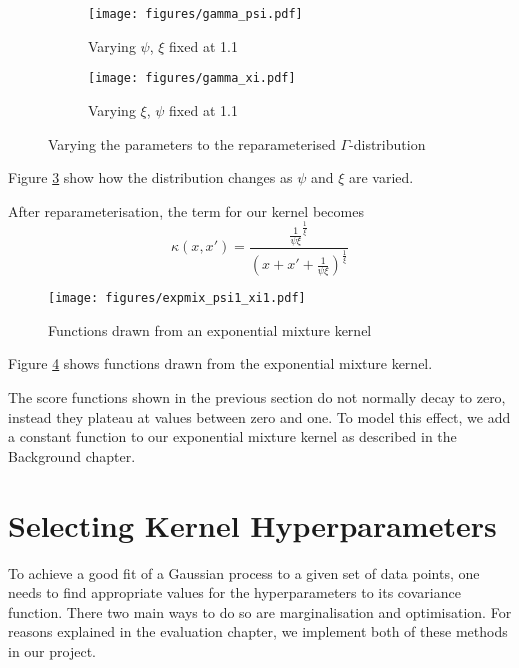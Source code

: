 \documentclass[a4paper,12pt,twoside,openright]{report}
\begin{document}
\begin{figure}
\centering
\begin{subfigure}{.5\textwidth}
  \centering
  \texttt{[image: figures/gamma\_psi.pdf]}
  \caption{Varying $\psi$, $\xi$ fixed at 1.1}
  \label{gammapsi}
\end{subfigure}%
\begin{subfigure}{.5\textwidth}
  \centering
  \texttt{[image: figures/gamma\_xi.pdf]}
  \caption{Varying $\xi$, $\psi$ fixed at 1.1}
  \label{gammaxi}
\end{subfigure}
\caption{Varying the parameters to the reparameterised $\Gamma$-distribution}
\label{gammadist}
\end{figure}


Figure \ref{gammadist} show how the distribution changes as $\psi$ and $\xi$ are varied.

After reparameterisation, the term for our kernel becomes
\begin{equation}
\kappa(x, x') = \frac{\frac{1}{\psi\xi}^{\frac{1}{\xi}}}{(x+x'+\frac{1}{\psi\xi})^{\frac{1}{\xi}}}
\end{equation}

\begin{figure}
\centering

  \centering
  \texttt{[image: figures/expmix\_psi1\_xi1.pdf]}
  \caption{Functions drawn from an exponential mixture kernel}
  \label{expmix11}
\end{figure}

Figure \ref{expmix11} shows functions drawn from the exponential mixture kernel. %

The score functions shown in the previous section do not normally decay to zero, instead they plateau at values between zero and one. To model this effect, we add a constant function to our exponential mixture kernel as described in the Background chapter.

\section{Selecting Kernel Hyperparameters} 


To achieve a good fit of a Gaussian process to a given set of data points, one needs to find appropriate values for the hyperparameters to its covariance function. There two main ways to do so are marginalisation and optimisation. For reasons explained in the evaluation chapter, we implement both of these methods in our project.
\end{document}
